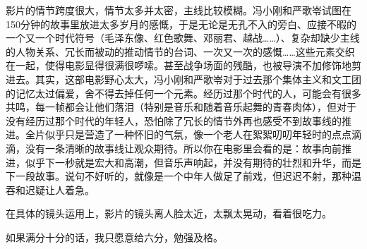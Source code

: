 影片的情节跨度很大，情节太多并太密，主线比较模糊。冯小刚和严歌岺试图在150分钟的故事里放进太多岁月的感慨，于是无论是无孔不入的旁白、应接不暇的一个又一个时代符号（毛泽东像、红色歌舞、邓丽君、越战……）、复杂却缺少主线的人物关系、冗长而被动的推动情节的台词、一次又一次的感慨……这些元素交织在一起，使得电影显得很满很啰嗦。甚至战争场面的残酷，也被导演不加修饰地剪进去。其实，这部电影野心太大，冯小刚和严歌岺对于过去那个集体主义和文工团的记忆太过偏爱，舍不得去掉任何一个元素。经历过那个时代的人，可能会有很多共鸣，每一帧都会让他们落泪（特别是音乐和随着音乐起舞的青春肉体），但对于没有经历过那个时代的年轻人，恐怕除了冗长的情节外再也感受不到故事线的推进。全片似乎只是营造了一种怀旧的气氛，像一个老人在絮絮叨叨年轻时的点点滴滴，没有一条清晰的故事线让观众期待。所以你在电影里会看的是：故事向前推进，似乎下一秒就是宏大和高潮，但音乐声响起，并没有期待的壮烈和升华，而是下一段故事。说句不好听的，就像是一个中年人做足了前戏，但迟迟不射，那种温吞和迟疑让人着急。

在具体的镜头运用上，影片的镜头离人脸太近，太飘太晃动，看着很吃力。

如果满分十分的话，我只愿意给六分，勉强及格。